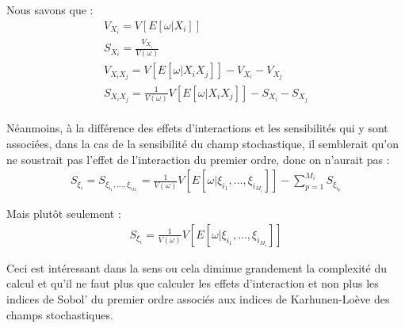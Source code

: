 \documentclass[a4paper,10pt]{article}
\begin{document}
Nous savons que : 
\begin{align}
V_{X_{i}} = V[E[\omega|X_{i}]] \\
S_{X_{i}} = \frac{V_{X_{i}}}{V(\omega)} \\
V_{X_{i}X_{j}} = V[E[\omega|X_{i}X_{j}]] - V_{X_{i}} - V_{X_{j}} \\
S_{X_{i}X_{j}} = \frac{1}{V(\omega)}V[E[\omega|X_{i}X_{j}]] - S_{X_{i}} - S_{X_{j}}
\end{align} \\

Néanmoins, à la différence des effets d'interactions et les sensibilités qui y sont associées, dans la cas de la sensibilité du champ stochastique, il semblerait qu'on ne soustrait pas l'effet de l'interaction du premier ordre, donc on n'aurait pas :
\begin{align}
S_{\xi_{i}} = S_{\xi_{i_{1}},\ldots,\xi_{i_{M_{i}}}} = \frac{1}{V(\omega)}V[E[\omega|\xi_{i_{1}},\ldots,\xi_{i_{M_{i}}}]] - \sum_{p=1}^{M_{i}}S_{\xi_{i_{p}}}
\end{align}

Mais plutôt seulement : 
\begin{align}
S_{\xi_{i}} = \frac{1}{V(\omega)}V[E[\omega|\xi_{i_{1}},\ldots,\xi_{i_{M_{i}}}]]
\end{align}

Ceci est intéressant dans la sens ou cela diminue grandement la complexité du calcul et qu'il ne faut plus que calculer les effets d'interaction et non plus les indices de Sobol’ du premier ordre associés aux indices de Karhunen-Loève des champs stochastiques. 


\end{document}
